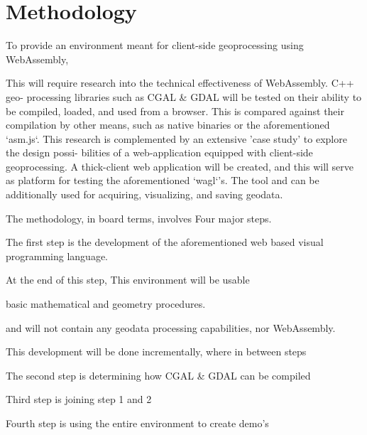 
\section{Methodology}

To provide an environment meant for client-side geoprocessing using WebAssembly,


This will require research into the technical effectiveness of WebAssembly. C++ geo-
processing libraries such as CGAL \& GDAL will be tested on their ability to be compiled,
loaded, and used from a browser. This is compared against their compilation by other
means, such as native binaries or the aforementioned ‘asm.js‘.
This research is complemented by an extensive ’case study’ to explore the design possi-
bilities of a web-application equipped with client-side geoprocessing. A thick-client web
application will be created, and this will serve as platform for testing the aforementioned
‘wagl‘’s. The tool and can be additionally used for acquiring, visualizing, and saving
geodata.

The methodology, in board terms, involves Four major steps. 

The first step is the development of the aforementioned web based visual programming language. 

At the end of this step, This environment will be usable 

basic mathematical and geometry procedures. 

and will not contain any geodata processing capabilities, nor WebAssembly. 

This development will be done incrementally, where in between steps 



The second step is determining how CGAL \& GDAL can be compiled



Third step is joining step 1 and 2



Fourth step is using the entire environment to create demo's





